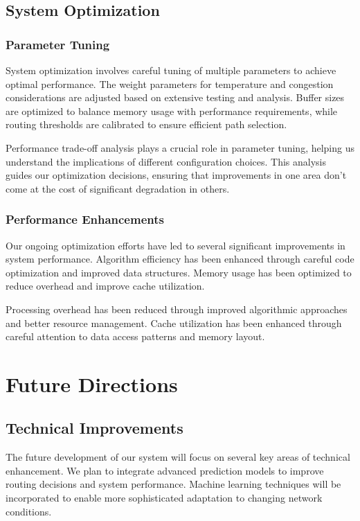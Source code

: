 \documentclass[12pt]{article}
\begin{document}
\subsection{System Optimization}
\subsubsection{Parameter Tuning}
System optimization involves careful tuning of multiple parameters to achieve optimal performance. The weight parameters for temperature and congestion considerations are adjusted based on extensive testing and analysis. Buffer sizes are optimized to balance memory usage with performance requirements, while routing thresholds are calibrated to ensure efficient path selection.

Performance trade-off analysis plays a crucial role in parameter tuning, helping us understand the implications of different configuration choices. This analysis guides our optimization decisions, ensuring that improvements in one area don't come at the cost of significant degradation in others.

\subsubsection{Performance Enhancements}
Our ongoing optimization efforts have led to several significant improvements in system performance. Algorithm efficiency has been enhanced through careful code optimization and improved data structures. Memory usage has been optimized to reduce overhead and improve cache utilization.

Processing overhead has been reduced through improved algorithmic approaches and better resource management. Cache utilization has been enhanced through careful attention to data access patterns and memory layout.

\section{Future Directions}
\subsection{Technical Improvements}
The future development of our system will focus on several key areas of technical enhancement. We plan to integrate advanced prediction models to improve routing decisions and system performance. Machine learning techniques will be incorporated to enable more sophisticated adaptation to changing network conditions.
\end{document}
